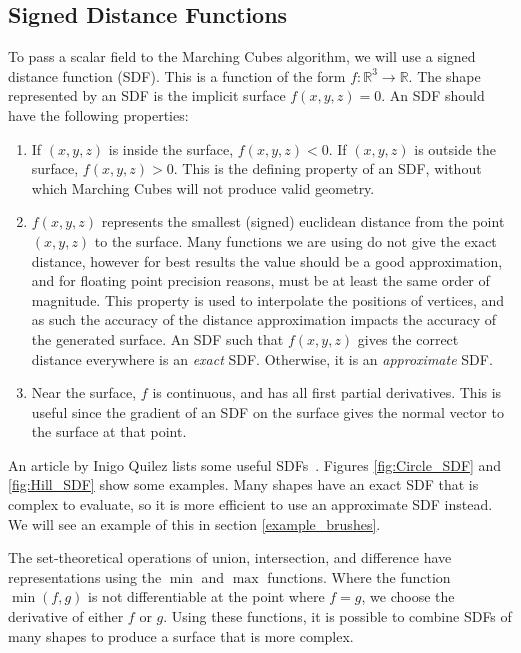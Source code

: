 \documentclass[11pt]{article}
\begin{document}
\subsection{Signed Distance Functions} 
\label{section:sdf}
To pass a scalar field to the Marching Cubes algorithm, we will use a signed distance function (SDF). This is a function of the form $f:\mathbb{R}^3 \rightarrow \mathbb{R}$. The shape represented by an SDF is the implicit surface $f\left(x,y,z\right) = 0$. An SDF should have the following properties:
\begin{enumerate}[label=\roman*.]
\item If $\left(x,y,z\right)$ is inside the surface, $f\left(x,y,z\right) < 0$. If $\left(x,y,z\right)$ is outside the surface, $f\left(x,y,z\right) > 0$. This is the defining property of an SDF, without which Marching Cubes will not produce valid geometry.
\item $f\left(x,y,z\right)$ represents the smallest (signed) euclidean distance from the point $\left(x,y,z\right)$ to the surface. Many functions we are using do not give the exact distance, however for best results the value should be a good approximation, and for floating point precision reasons, must be at least the same order of magnitude. This property is used to interpolate the positions of vertices, and as such the accuracy of the distance approximation impacts the accuracy of the generated surface. An SDF such that $f\left(x,y,z\right)$ gives the correct distance everywhere is an \textit{exact} SDF. Otherwise, it is an \textit{approximate} SDF.
\item Near the surface, $f$ is continuous, and has all first partial derivatives. This is useful since the gradient of an SDF on the surface gives the normal vector to the surface at that point.
\end{enumerate}

An article by Inigo Quilez lists some useful SDFs~\cite{quilez:sdf}. Figures \ref{fig:Circle_SDF} and \ref{fig:Hill_SDF} show some examples. Many shapes have an exact SDF that is complex to evaluate, so it is more efficient to use an approximate SDF instead. We will see an example of this in section \ref{example_brushes}.

The set-theoretical operations of union, intersection, and difference have representations using the $\min$ and $\max$ functions. Where the function $\min\left(f,g\right)$ is not differentiable at the point where $f = g$, we choose the derivative of either $f$ or $g$. Using these functions, it is possible to combine SDFs of many shapes to produce a surface that is more complex.
\end{document}
